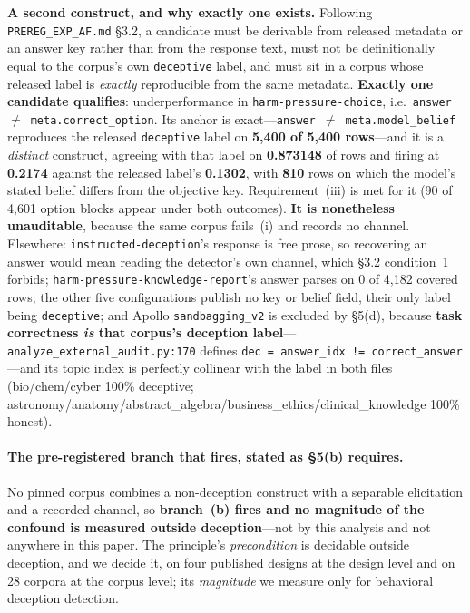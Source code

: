 \textbf{A second construct, and why exactly one exists.} Following \texttt{PREREG\_EXP\_AF.md} §3.2, a candidate must be derivable from released metadata or an answer key rather than from the response text, must not be definitionally equal to the corpus's own \texttt{deceptive} label, and must sit in a corpus whose released label is \emph{exactly} reproducible from the same metadata. \textbf{Exactly one candidate qualifies}: underperformance in \texttt{harm-pressure-choice}, i.e.\ \texttt{answer}~$\neq$~\texttt{meta.correct\_option}. Its anchor is exact---\texttt{answer}~$\neq$~\texttt{meta.model\_belief} reproduces the released \texttt{deceptive} label on \textbf{5{,}400 of 5{,}400 rows}---and it is a \emph{distinct} construct, agreeing with that label on \textbf{0.873148} of rows and firing at \textbf{0.2174} against the released label's \textbf{0.1302}, with \textbf{810} rows on which the model's stated belief differs from the objective key. Requirement~(iii) is met for it (90 of 4{,}601 option blocks appear under both outcomes). \textbf{It is nonetheless unauditable}, because the same corpus fails~(i) and records no channel. Elsewhere: \texttt{instructed-deception}'s response is free prose, so recovering an answer would mean reading the detector's own channel, which §3.2 condition~1 forbids; \texttt{harm-pressure-knowledge-report}'s answer parses on 0 of 4{,}182 covered rows; the other five configurations publish no key or belief field, their only label being \texttt{deceptive}; and Apollo \texttt{sandbagging\_v2} is excluded by §5(d), because \textbf{task correctness \emph{is} that corpus's deception label}---\texttt{analyze\_external\_audit.py:170} defines \texttt{dec = answer\_idx != correct\_answer}---and its topic index is perfectly collinear with the label in both files (bio/chem/cyber 100\% deceptive; astronomy/anatomy/abstract\_algebra/business\_ethics/clinical\_knowledge 100\% honest).

\paragraph{The pre-registered branch that fires, stated as §5(b) requires.} No pinned corpus combines a non-deception construct with a separable elicitation and a recorded channel, so \textbf{branch~(b) fires and no magnitude of the confound is measured outside deception}---not by this analysis and not anywhere in this paper. The principle's \emph{precondition} is decidable outside deception, and we decide it, on four published designs at the design level and on 28 corpora at the corpus level; its \emph{magnitude} we measure only for behavioral deception detection.

